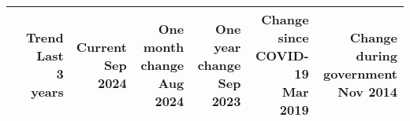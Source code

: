 \begin{table}[H]
\begin{tabular}{l r r r r r r}
\hline
  & \thead[r]{\textbf{Trend} \\ \small{Last 3 years}} & \thead[r]{\textbf{Current} \\ \small{Sep 2024}} & \thead[r]{\textbf{One month change} \\ \small{Aug 2024}} & \thead[r]{\textbf{One year change} \\ \small{Sep 2023}} & \thead[r]{\textbf{Change since COVID-19} \\ \small{Mar 2019}} & \thead[r]{\textbf{Change during government} \\ \small{Nov 2014}} \\
\hline
\end{tabular}
\end{table}
